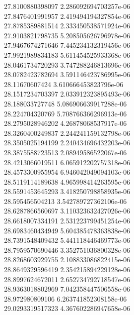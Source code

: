 {27.8100880398097 2.286092694703257e-06 \\
27.8476401991957 2.419494194327854e-06 \\
27.8785389881514 2.333450538571924e-06 \\
27.9103821798735 5.208505626796978e-06 \\
27.9467674271646 7.445234132319456e-06 \\
27.9921989834183 5.611454525933368e-06 \\
28.0461734720293 3.747288246813696e-06 \\
28.0782423782694 3.591146423786995e-06 \\
28.11670607424 3.610666453823796e-06 \\
28.1517234703397 2.033912323895493e-06 \\
28.188033727748 5.086906639917288e-06 \\
28.224704320769 5.708766366296913e-06 \\
28.2795028946202 4.26878068537917e-06 \\
28.3260400249837 2.244241159132798e-06 \\
28.3505025194199 2.240434696432203e-06 \\
28.3875588723513 2.08949586522067e-06 \\
28.4213066019511 6.065912202757318e-06 \\
28.4573300955954 6.946042049094103e-06 \\
28.5119114189638 4.965998414263595e-06 \\
28.5591453645293 3.418250798858935e-06 \\
28.595456504213 3.542789727362106e-06 \\
28.6287866560697 3.110323632427026e-06 \\
28.6618007334191 2.531223799451254e-06 \\
28.6983460434949 5.604385478363838e-06 \\
28.7391548409432 5.441118446469773e-06 \\
28.7959570690446 3.352751036800328e-06 \\
28.8268603929755 2.108833086822415e-06 \\
28.8649329596419 2.354215894229128e-06 \\
28.8997624672011 2.652734792718547e-06 \\
28.9363018802969 7.042358447506558e-06 \\
28.972980809106 6.263741852308158e-06 \\
29.0293319517323 4.367602286947658e-06 \\
}
